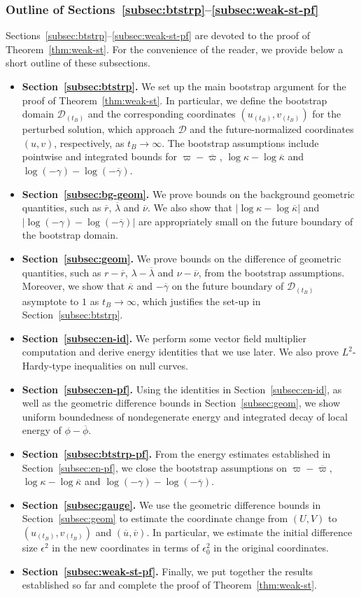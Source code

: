 \documentclass[10pt, reqno]{amsart}
\theoremstyle{definition}
\theoremstyle{remark}
\theoremstyle{conjecture}
\numberwithin{equation}{section}
\newcommand{\abs}[1]{\vert#1\vert}
\newcommand{\0}{\emptyset}
\newcommand{\gmm}{\gamma}
\newcommand{\eps}{\epsilon}
\newcommand{\kpp}{\kappa}
\newcommand{\lmb}{\lambda}
\newcommand{\calD}{\mathcal D}
\newcommand{\calH}{\mathcal H}
\newcommand{\calI}{\mathcal I}
\newcommand{\dur}{\nu}
\newcommand{\dvr}{\lmb}
\newcommand{\EH}{\calH^{+}}
\newcommand{\NI}{\calI^{+}}						%
\newcommand{\ubg}{\overline{u}}					%
\newcommand{\vbg}{\overline{v}}					%
\newcommand{\phibg}{\overline{\phi}}				%
\newcommand{\dvrbg}{\overline{\dvr}}				%
\newcommand{\durbg}{\overline{\dur}}				%
\newcommand{\rbg}{\overline{r}}					%
\newcommand{\varpibg}{\overline{\varpi}}				%
\newcommand{\kppbg}{\overline{\kpp}}					%
\newcommand{\gmmbg}{\overline{\gmm}}					%
\begin{document}
\subsubsection*{Outline of Sections~\ref{subsec:btstrp}--\ref{subsec:weak-st-pf}}
Sections~\ref{subsec:btstrp}--\ref{subsec:weak-st-pf} are devoted to the proof of Theorem~\ref{thm:weak-st}. For the convenience of the reader, we provide below a short outline of these subsections.
\begin{itemize}
\item {\bf Section~\ref{subsec:btstrp}.} We set up the main bootstrap argument for the proof of Theorem~\ref{thm:weak-st}. In particular, we define the bootstrap domain $\calD_{(t_{B})}$ and the corresponding coordinates $(u_{(t_{B})}, v_{(t_{B})})$ for the perturbed solution, which approach $\calD$ and the future-normalized coordinates $(u, v)$, respectively, as $t_{B} \to \infty$. The bootstrap assumptions include pointwise and integrated bounds for $\varpi - \varpibg$, $\log \kpp - \log \kppbg$ and $\log (-\gmm) - \log(-\gmmbg)$.
\item {\bf Section~\ref{subsec:bg-geom}.} We prove bounds on the background geometric quantities, such as $\rbg$, $\dvrbg$ and $\durbg$. We also show that $\abs{\log \kpp - \log \kppbg}$ and $\abs{\log (-\gmm) - \log (-\gmmbg)}$ are appropriately small on the future boundary of the bootstrap domain.
\item {\bf Section~\ref{subsec:geom}.} We prove bounds on the difference of geometric quantities, such as $r - \rbg$, $\dvr - \dvrbg$ and $\dur - \durbg$, from the bootstrap assumptions. Moreover, we show that $\kppbg$ and $-\gmmbg$ on the future boundary of $\calD_{(t_{B})}$ asymptote to $1$ as $t_{B} \to \infty$, which justifies the set-up in Section~\ref{subsec:btstrp}.
\item {\bf Section~\ref{subsec:en-id}.} We perform some vector field multiplier computation and derive energy identities that we use later. We also prove $L^{2}$-Hardy-type inequalities on null curves.
\item {\bf Section~\ref{subsec:en-pf}.} Using the identities in Section~\ref{subsec:en-id}, as well as the geometric difference bounds in Section~\ref{subsec:geom}, we show uniform boundedness of nondegenerate energy and integrated decay of local energy of $\phi - \phibg$.
\item {\bf Section~\ref{subsec:btstrp-pf}.} From the energy estimates established in Section~\ref{subsec:en-pf}, we close the bootstrap assumptions on $\varpi - \varpibg$, $\log \kpp - \log \kppbg$ and $\log (-\gmm) - \log(-\gmmbg)$.
\item {\bf Section~\ref{subsec:gauge}.} We use the geometric difference bounds in Section~\ref{subsec:geom} to estimate the coordinate change from $(U, V)$ to $(u_{(t_{B})}, v_{(t_{B})})$ and $(\ubg, \vbg)$. In particular, we estimate the initial difference size $\eps^{2}$ in the new coordinates in terms of $\eps_{0}^{2}$ in the original coordinates.
\item {\bf Section~\ref{subsec:weak-st-pf}.} Finally, we put together the results established so far and complete the proof of Theorem~\ref{thm:weak-st}.
\end{itemize}
\end{document}
